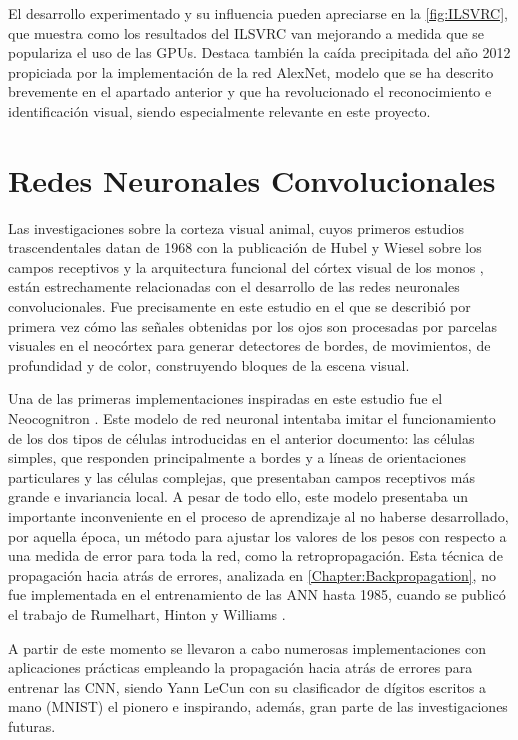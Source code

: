 El desarrollo experimentado y su influencia pueden apreciarse en la \autoref{fig:ILSVRC}, que muestra como los resultados del ILSVRC van mejorando a medida que se populariza el uso de las GPUs. Destaca también la caída precipitada del año 2012 propiciada por la implementación de la red AlexNet, modelo que se ha descrito brevemente en el apartado anterior y que ha revolucionado el reconocimiento e identificación visual, siendo especialmente relevante en este proyecto.

\section{Redes Neuronales Convolucionales} \label{Chapter:CNN}

Las investigaciones sobre la corteza visual animal, cuyos primeros estudios trascendentales datan de 1968 con la publicación de Hubel y Wiesel sobre los campos receptivos y la arquitectura funcional del córtex visual de los monos \cite{Hubel}, están estrechamente relacionadas con el desarrollo de las redes neuronales convolucionales. Fue precisamente en este estudio en el que se describió por primera vez cómo las señales obtenidas por los ojos son procesadas por parcelas visuales en el neocórtex para generar detectores de bordes, de movimientos, de profundidad y de color, construyendo bloques de la escena visual.

Una de las primeras implementaciones inspiradas en este estudio fue el Neocognitron \cite{Neocognitron}. Este modelo de red neuronal intentaba imitar el funcionamiento de los dos tipos de células introducidas en el anterior documento: las células simples, que responden principalmente a bordes y a líneas de orientaciones particulares y las células complejas, que presentaban campos receptivos más grande e invariancia local. A pesar de todo ello, este modelo presentaba un importante inconveniente en el proceso de aprendizaje al no haberse desarrollado, por aquella época, un método para ajustar los valores de los pesos con respecto a una medida de error para toda la red, como la retropropagación. Esta técnica de propagación hacia atrás de errores, analizada en \autoref{Chapter:Backpropagation}, no fue implementada en el entrenamiento de las ANN hasta 1985, cuando se publicó el trabajo de Rumelhart, Hinton y Williams \cite{Rumelhart}.

A partir de este momento se llevaron a cabo numerosas implementaciones con aplicaciones prácticas empleando la propagación hacia atrás de errores para entrenar las CNN, siendo Yann LeCun con su clasificador de dígitos escritos a mano (MNIST) \cite{MNIST} el pionero e inspirando, además, gran parte de las investigaciones futuras.

